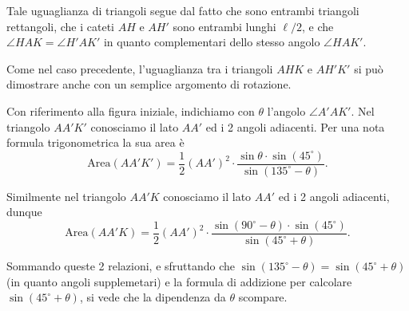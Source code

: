{Tale uguaglianza di triangoli segue dal fatto che sono entrambi triangoli rettangoli, che i cateti $AH$ e $AH'$ sono entrambi lunghi $\ell/2$, e che $\angle HAK=\angle H'AK'$ in quanto complementari dello stesso angolo $\angle HAK'$.

Come nel caso precedente, l'uguaglianza tra i triangoli $AHK$ e $AH'K'$ si può dimostrare anche con un semplice argomento di rotazione.

\TitoloSoluzioneAlternativaB Con riferimento alla figura iniziale,
indichiamo con $\theta$ l'angolo $\angle A'AK'$.  Nel triangolo $AA'K'$ conosciamo il lato $AA'$ ed i 2 angoli adiacenti.  Per una nota formula trigonometrica la sua area è
$$\mbox{Area}(AA'K')=\frac{1}{2}(AA')^{2}\cdot
\frac{\sin\theta\cdot\sin(45^{\circ})}{\sin(135^{\circ}-\theta)}.$$

Similmente nel triangolo $AA'K$ conosciamo il lato $AA'$ ed i 2 angoli adiacenti, dunque
$$\mbox{Area}(AA'K)=\frac{1}{2}(AA')^{2}\cdot
\frac{\sin(90^{\circ}-\theta)\cdot
\sin(45^{\circ})}{\sin(45^{\circ}+\theta)}.$$

Sommando queste 2 relazioni, e sfruttando che $\sin(135^{\circ}-\theta)=\sin(45^{\circ}+\theta)$ (in quanto angoli supplemetari) e la formula di addizione per calcolare $\sin(45^{\circ}+\theta)$, si vede che la dipendenza da $\theta$ scompare.
}

\renewcommand{\Osservazioni}{
% 
}

\renewcommand{\Commenti}{
}
